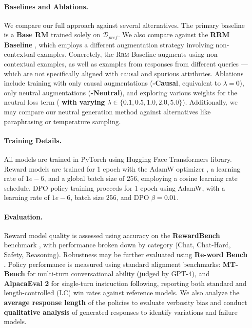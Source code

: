 \paragraph{Baselines and Ablations.}
We compare our full \carma{} approach against several alternatives. The primary baseline is a \textbf{Base RM} trained solely on $\mathcal{D}_{pref}$. We also compare against the \textbf{RRM Baseline} \cite{liu2024rrm}, which employs a different augmentation strategy involving non-contextual examples. 
Concretely, the \textsc{Rrm} Baseline augments using non-contextual examples, as well as examples from responses from different queries --- which are not specifically aligned with causal and spurious attributes. 
Ablations include training \carma{} with only causal augmentations (\textbf{\carma-Causal}, equivalent to $\lambda=0$), only neutral augmentations (\textbf{\carma-Neutral}), and exploring various weights for the neutral loss term (\textbf{\carma{} with varying $\lambda \in \{0.1, 0.5, 1.0, 2.0, 5.0\}$}). Additionally, we may compare our neutral generation method against alternatives like paraphrasing or temperature sampling.

\paragraph{Training Details.}
All models are trained in PyTorch using Hugging Face Transformers library. Reward models are trained for 1 epoch with the AdamW optimizer \cite{loshchilov2017decoupled}, a learning rate of $1e-6$, and a global batch size of $256$, employing a cosine learning rate schedule. DPO policy training proceeds for 1 epoch using AdamW, with a learning rate of $1e-6$, batch size $256$, and DPO $\beta = 0.01$.

\paragraph{Evaluation.}
Reward model quality is assessed using accuracy on the \textbf{RewardBench} benchmark \cite{lambert2024rewardbench}, with performance broken down by category (Chat, Chat-Hard, Safety, Reasoning). Robustness may be further evaluated using \textbf{Re-word Bench} \cite{wu2025rewordbench}. Policy performance is measured using standard alignment benchmarks: \textbf{MT-Bench} \cite{zheng2023judging} for multi-turn conversational ability (judged by GPT-4), and \textbf{AlpacaEval 2} \cite{alpaca_eval} for single-turn instruction following, reporting both standard and length-controlled (LC) win rates against reference models. We also analyze the \textbf{average response length} of the policies to evaluate verbosity bias and conduct \textbf{qualitative analysis} of generated responses to identify variations and failure models.